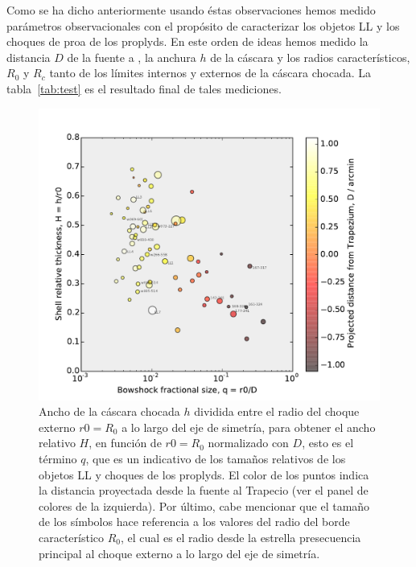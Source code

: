 Como se ha dicho anteriormente usando éstas observaciones hemos medido parámetros observacionales con el propósito de caracterizar los objetos LL y los choques de proa de los proplyds. En este orden de ideas hemos medido la distancia \(D\) de la fuente a \thC{}, la anchura \(h\) de la cáscara y los radios característicos, \(R_{0}\) y \(R_{c}\) tanto de los límites internos y externos de la cáscara chocada. La tabla~\ref{tab:test} es el resultado final de tales mediciones.\\

\begin{figure}
  \centering
  \includegraphics[width=\linewidth]{luis-programas/will-H-vs-q}
  \caption{Ancho de la cáscara chocada \(h\) dividida entre el radio del choque externo \(r0 = R_{0}\) a lo largo del eje de simetría, para obtener el ancho relativo \(H\), en función de  \(r0 = R_{0}\) normalizado con \(D\), esto es el término \(q\), que es un indicativo de los tamaños relativos de los objetos LL y choques de los proplyds. El color de los puntos indica la distancia proyectada desde la fuente al Trapecio (ver el panel de colores de la izquierda). Por último, cabe mencionar que el tamaño de los símbolos hace referencia a los valores del radio del borde característico  \(R_{0}\), el cual es el radio desde la estrella presecuencia principal al choque externo a lo largo del eje de simetría.}
  \label{fig:thikness}
\end{figure} 

